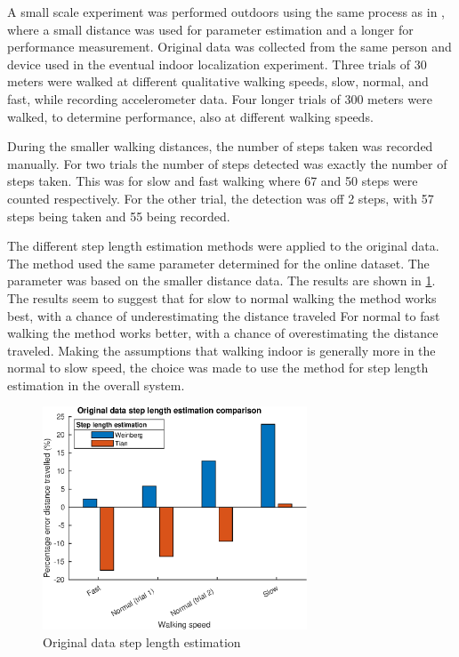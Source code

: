 A small scale experiment was performed outdoors using the same process as in \cite{Vezocnik2019}, where a small distance was used for parameter estimation and a longer for performance measurement. Original data was collected from the same person and device used in the eventual indoor localization experiment. Three trials of 30 meters were walked at different qualitative walking speeds, slow, normal, and fast, while recording accelerometer data. Four longer trials of 300 meters were walked, to determine performance, also at different walking speeds. \par 
During the smaller walking distances, the number of steps taken was recorded manually. For two trials the number of steps detected was exactly the number of steps taken. This was for slow and fast walking where 67 and 50 steps were counted respectively.  For the other trial, the detection was off 2 steps, with 57 steps being taken and 55 being recorded. \par 
The different step length estimation methods were applied to the original data. The \citet{Tian2016} method used the same parameter determined for the online dataset. The \citet{Weinberg2002} parameter was based on the smaller distance data. The results are shown in \cref{fig:step_length_personal_testing}. The results seem to suggest that for slow to normal walking the \citet{Tian2016} method works best, with a chance of underestimating the distance traveled For normal to fast walking the \citet{Weinberg2002} method works better, with a chance of overestimating the distance traveled. Making the assumptions that walking indoor is generally more in the normal to slow speed, the choice was made to use the \citet{Tian2016} method for step length estimation in the overall system.
\begin{figure}[H]
	\centering
	\includegraphics[width=0.7\textwidth]{images/20201113_1920_wienberg_vs_tian_og_data_1}
	\caption{Original data step length estimation \\ }
	\label{fig:step_length_personal_testing}
\end{figure}
\newpage
